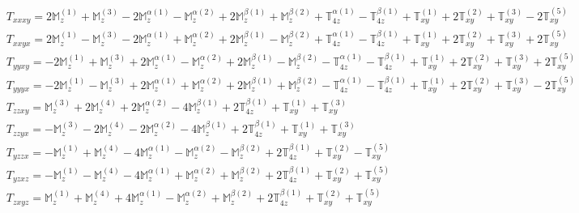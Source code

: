 \documentclass[fleqn,8pt,landscape]{jsarticle}
\begin{document}
\begin{align*}
& T_{xxxy} = 2 \mathbb{M}_{z}^{(1)} + \mathbb{M}_{z}^{(3)} - 2 \mathbb{M}_{z}^{\alpha(1)} - \mathbb{M}_{z}^{\alpha(2)} + 2 \mathbb{M}_{z}^{\beta(1)} + \mathbb{M}_{z}^{\beta(2)} + \mathbb{T}_{4z}^{\alpha(1)} - \mathbb{T}_{4z}^{\beta(1)} + \mathbb{T}_{xy}^{(1)} + 2 \mathbb{T}_{xy}^{(2)} + \mathbb{T}_{xy}^{(3)} - 2 \mathbb{T}_{xy}^{(5)} \\
& T_{xxyx} = 2 \mathbb{M}_{z}^{(1)} - \mathbb{M}_{z}^{(3)} - 2 \mathbb{M}_{z}^{\alpha(1)} + \mathbb{M}_{z}^{\alpha(2)} + 2 \mathbb{M}_{z}^{\beta(1)} - \mathbb{M}_{z}^{\beta(2)} + \mathbb{T}_{4z}^{\alpha(1)} - \mathbb{T}_{4z}^{\beta(1)} + \mathbb{T}_{xy}^{(1)} + 2 \mathbb{T}_{xy}^{(2)} + \mathbb{T}_{xy}^{(3)} + 2 \mathbb{T}_{xy}^{(5)} \\
& T_{yyxy} = - 2 \mathbb{M}_{z}^{(1)} + \mathbb{M}_{z}^{(3)} + 2 \mathbb{M}_{z}^{\alpha(1)} - \mathbb{M}_{z}^{\alpha(2)} + 2 \mathbb{M}_{z}^{\beta(1)} - \mathbb{M}_{z}^{\beta(2)} - \mathbb{T}_{4z}^{\alpha(1)} - \mathbb{T}_{4z}^{\beta(1)} + \mathbb{T}_{xy}^{(1)} + 2 \mathbb{T}_{xy}^{(2)} + \mathbb{T}_{xy}^{(3)} + 2 \mathbb{T}_{xy}^{(5)} \\
& T_{yyyx} = - 2 \mathbb{M}_{z}^{(1)} - \mathbb{M}_{z}^{(3)} + 2 \mathbb{M}_{z}^{\alpha(1)} + \mathbb{M}_{z}^{\alpha(2)} + 2 \mathbb{M}_{z}^{\beta(1)} + \mathbb{M}_{z}^{\beta(2)} - \mathbb{T}_{4z}^{\alpha(1)} - \mathbb{T}_{4z}^{\beta(1)} + \mathbb{T}_{xy}^{(1)} + 2 \mathbb{T}_{xy}^{(2)} + \mathbb{T}_{xy}^{(3)} - 2 \mathbb{T}_{xy}^{(5)} \\
& T_{zzxy} = \mathbb{M}_{z}^{(3)} + 2 \mathbb{M}_{z}^{(4)} + 2 \mathbb{M}_{z}^{\alpha(2)} - 4 \mathbb{M}_{z}^{\beta(1)} + 2 \mathbb{T}_{4z}^{\beta(1)} + \mathbb{T}_{xy}^{(1)} + \mathbb{T}_{xy}^{(3)} \\
& T_{zzyx} = - \mathbb{M}_{z}^{(3)} - 2 \mathbb{M}_{z}^{(4)} - 2 \mathbb{M}_{z}^{\alpha(2)} - 4 \mathbb{M}_{z}^{\beta(1)} + 2 \mathbb{T}_{4z}^{\beta(1)} + \mathbb{T}_{xy}^{(1)} + \mathbb{T}_{xy}^{(3)} \\
& T_{yzzx} = - \mathbb{M}_{z}^{(1)} + \mathbb{M}_{z}^{(4)} - 4 \mathbb{M}_{z}^{\alpha(1)} - \mathbb{M}_{z}^{\alpha(2)} - \mathbb{M}_{z}^{\beta(2)} + 2 \mathbb{T}_{4z}^{\beta(1)} + \mathbb{T}_{xy}^{(2)} - \mathbb{T}_{xy}^{(5)} \\
& T_{yzxz} = - \mathbb{M}_{z}^{(1)} - \mathbb{M}_{z}^{(4)} - 4 \mathbb{M}_{z}^{\alpha(1)} + \mathbb{M}_{z}^{\alpha(2)} + \mathbb{M}_{z}^{\beta(2)} + 2 \mathbb{T}_{4z}^{\beta(1)} + \mathbb{T}_{xy}^{(2)} + \mathbb{T}_{xy}^{(5)} \\
& T_{zxyz} = \mathbb{M}_{z}^{(1)} + \mathbb{M}_{z}^{(4)} + 4 \mathbb{M}_{z}^{\alpha(1)} - \mathbb{M}_{z}^{\alpha(2)} + \mathbb{M}_{z}^{\beta(2)} + 2 \mathbb{T}_{4z}^{\beta(1)} + \mathbb{T}_{xy}^{(2)} + \mathbb{T}_{xy}^{(5)} \\

\end{align*}
\end{document}
